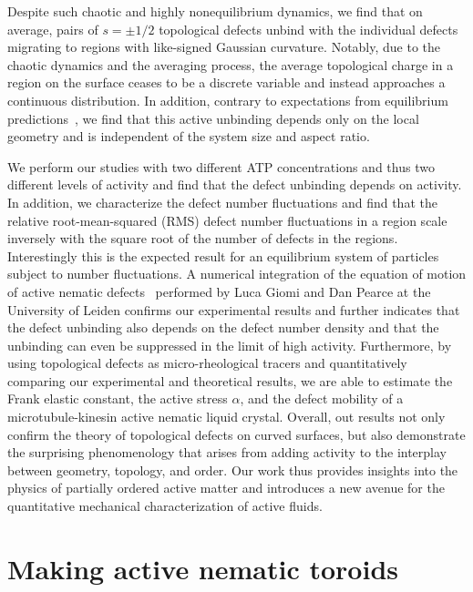 Despite such chaotic and highly nonequilibrium dynamics, we find that on average, pairs of $s = \pm 1/2$ topological defects unbind with the individual defects migrating to regions with like-signed Gaussian curvature.
Notably, due to the chaotic dynamics and the averaging process, the average topological charge in a region on the surface ceases to be a discrete variable and instead approaches a continuous distribution.
In addition, contrary to expectations from equilibrium predictions~\cite{RN36,RN19,RN22,RN20,RN78}, we find that this active unbinding depends only on the local geometry and is independent of the system size and aspect ratio.

We perform our studies with two different ATP concentrations and thus two different levels of activity and find that the defect unbinding depends on activity.
In addition, we characterize the defect number fluctuations and find that the relative root-mean-squared (RMS) defect number fluctuations in a region scale inversely with the square root of the number of defects in the regions.
Interestingly this is the expected result for an equilibrium system of particles subject to number fluctuations.
A numerical integration of the equation of motion of active nematic defects~\cite{RN11,RN8,RN9} performed by Luca Giomi and Dan Pearce at the University of Leiden confirms our experimental results and further indicates that the defect unbinding also depends on the defect number density and that the unbinding can even be suppressed in the limit of high activity.
Furthermore, by using topological defects as micro-rheological tracers and quantitatively comparing our experimental and theoretical results, we are able to estimate the Frank elastic constant, the active stress $\alpha$, and the defect mobility of a microtubule-kinesin active nematic liquid crystal.
Overall, out results not only confirm the theory of topological defects on curved surfaces, but also demonstrate the surprising phenomenology that arises from adding activity to the interplay between geometry, topology, and order.
Our work thus provides insights into the physics of partially ordered active matter and introduces a new avenue for the quantitative mechanical characterization of active fluids.


\section{Making active nematic toroids}
